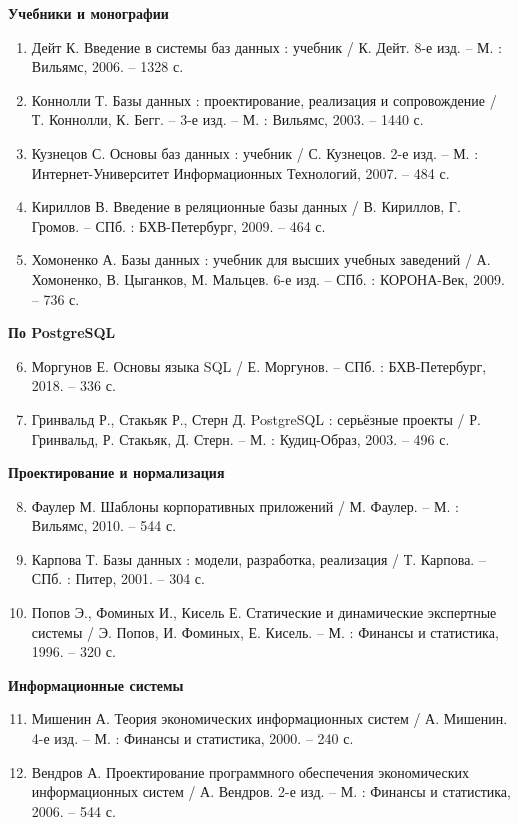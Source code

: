 \documentclass[14pt, a4paper]{extreport}
\begin{document}
\textbf{Учебники и монографии}
\begin{enumerate}
    \item Дейт К. Введение в системы баз данных : учебник / К. Дейт. 8-е изд. -- М. : Вильямс, 2006. -- 1328 с.
    \item Коннолли Т. Базы данных : проектирование, реализация и сопровождение / Т. Коннолли, К. Бегг. -- 3-е изд. -- М. : Вильямс, 2003. -- 1440 с.
    \item Кузнецов С. Основы баз данных : учебник / С. Кузнецов. 2-е изд. -- М. : Интернет-Университет Информационных Технологий, 2007. -- 484 с.
    \item Кириллов В. Введение в реляционные базы данных / В. Кириллов, Г. Громов. -- СПб. : БХВ-Петербург, 2009. -- 464 с.
    \item Хомоненко А. Базы данных : учебник для высших учебных заведений / А. Хомоненко, В. Цыганков, М. Мальцев. 6-е изд. -- СПб. : КОРОНА-Век, 2009. -- 736 с.
\end{enumerate}

\textbf{По PostgreSQL}
\begin{enumerate}
    \setcounter{enumi}{5}
    \item Моргунов Е. Основы языка SQL / Е. Моргунов. -- СПб. : БХВ-Петербург, 2018. -- 336 с.
    \item Гринвальд Р., Стакьяк Р., Стерн Д. PostgreSQL : серьёзные проекты / Р. Гринвальд, Р. Стакьяк, Д. Стерн. -- М. : Кудиц-Образ, 2003. -- 496 с.
\end{enumerate}

\textbf{Проектирование и нормализация}
\begin{enumerate}
    \setcounter{enumi}{7}
    \item Фаулер М. Шаблоны корпоративных приложений / М. Фаулер. -- М. : Вильямс, 2010. -- 544 с.
    \item Карпова Т. Базы данных : модели, разработка, реализация / Т. Карпова. -- СПб. : Питер, 2001. -- 304 с.
    \item Попов Э., Фоминых И., Кисель Е. Статические и динамические экспертные системы / Э. Попов, И. Фоминых, Е. Кисель. -- М. : Финансы и статистика, 1996. -- 320 с.
\end{enumerate}

\textbf{Информационные системы}
\begin{enumerate}
    \setcounter{enumi}{10}
    \item Мишенин А. Теория экономических информационных систем / А. Мишенин. 4-е изд. -- М. : Финансы и статистика, 2000. -- 240 с.
    \item Вендров А. Проектирование программного обеспечения экономических информационных систем / А. Вендров. 2-е изд. -- М. : Финансы и статистика, 2006. -- 544 с.
\end{enumerate}
\end{document}
